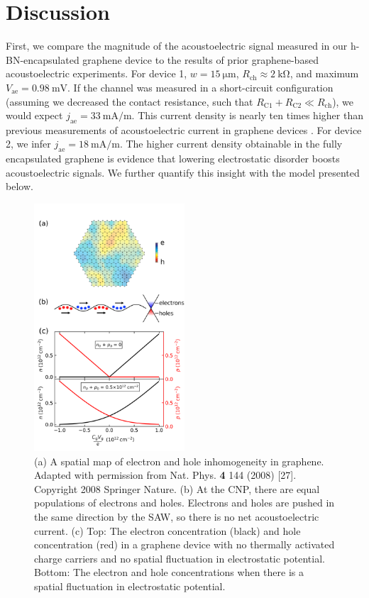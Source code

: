 \documentclass[double,12pt,1in,seploa]{beavtex}
\let\Oldsection\section
\renewcommand{\section}{\FloatBarrier\Oldsection}
\begin{document}
\section{Discussion} \label{AE paper discussion}
First, we compare the magnitude of the acoustoelectric signal measured in our h-BN-encapsulated graphene device to the results of prior graphene-based acoustoelectric experiments. For device 1, $w = \SI{15}{\micro\meter}$, $R_{\mathrm{ch}} \approx \SI{2}{\kilo\ohm}$, and maximum  $V_{\mathrm{ae}} = \SI{0.98}{\milli\volt}$. If the channel was measured in a short-circuit configuration (assuming we decreased the contact resistance, such that $R_{\mathrm{C1}} + R_{\mathrm{C2}} \ll R_{\mathrm{ch}}$), we would expect $j_{\mathrm{ae}} = \SI{33}{\milli \ampere/\meter}$. This current density is nearly ten times higher than previous measurements of acoustoelectric current in graphene devices \cite{bandhu_controlling_2016,okuda_acoustic_2016,tang_ultra-low_2017,okuda_graphene_2018}. For device 2, we infer $j_{\mathrm{ae}} = \SI{18}{\milli \ampere/\meter}$. The higher current density obtainable in the fully encapsulated graphene is evidence that lowering electrostatic disorder boosts acoustoelectric signals. We further quantify this insight with the model presented below.

\begin{figure}
    \includegraphics[width =  0.5\textwidth]{Figure 3 n and p_corrected.png}
    \caption{(a) A spatial map of electron and hole inhomogeneity in graphene. Adapted with permission from Nat. Phys. \textbf{4} 144 (2008) [27]. Copyright 2008 Springer Nature. (b) At the CNP, there are equal populations of electrons and holes. Electrons and holes are pushed in the same direction by the SAW, so there is no net acoustoelectric current. (c) Top: The electron concentration (black) and hole concentration (red) in a graphene device with no thermally activated charge carriers and no spatial fluctuation in electrostatic potential. Bottom: The electron and hole concentrations when there is a spatial fluctuation in electrostatic potential.}
    \label{AECP Figure 3}
\end{figure}
\end{document}

